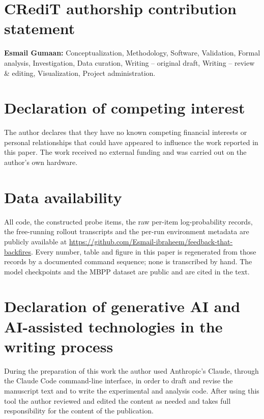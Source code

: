 %

\section*{CRediT authorship contribution statement}

\textbf{Esmail Gumaan:} Conceptualization, Methodology, Software, Validation,
Formal analysis, Investigation, Data curation, Writing -- original draft,
Writing -- review \& editing, Visualization, Project administration.

\section*{Declaration of competing interest}

The author declares that they have no known competing financial interests or
personal relationships that could have appeared to influence the work reported
in this paper. The work received no external funding and was carried out on the
author's own hardware.

\section*{Data availability}

All code, the constructed probe items, the raw per-item log-probability records,
the free-running rollout transcripts and the per-run environment metadata are
publicly available at
\url{https://github.com/Esmail-ibraheem/feedback-that-backfires}. Every number,
table and figure in this paper is regenerated from those records by a documented
command sequence; none is transcribed by hand. The model checkpoints and the
MBPP dataset are public and are cited in the text.

\section*{Declaration of generative AI and AI-assisted technologies in the writing process}

During the preparation of this work the author used Anthropic's Claude, through
the Claude Code command-line interface, in order to draft and revise the
manuscript text and to write the experimental and analysis code. After using
this tool the author reviewed and edited the content as needed and takes full
responsibility for the content of the publication.
